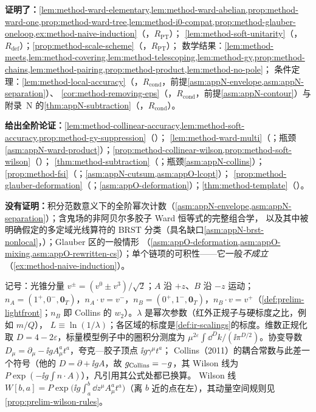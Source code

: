 \begin{tcolorbox}[enhanced,breakable,title=本章证明了什么／没有证明什么,fonttitle=\bfseries,
  colback=gray!3!white,colframe=gray!55!black,boxrule=0.6pt,arc=2pt,
  left=5pt,right=5pt,top=3pt,bottom=3pt,before skip=6pt,after skip=6pt]
\textbf{证明了：}\cref{lem:method-ward-elementary,lem:method-ward-abelian,prop:method-ward-one,prop:method-ward-tree,lem:method-i0-compat,prop:method-glauber-oneloop,ex:method-naive-induction}（\tagR，$R_{\mathrm{PT}}$）；
\cref{lem:method-soft-unitarity}（\tagR，$R_{\mathrm{def}}$）；\cref{prop:method-scale-scheme}（\tagR，$R_{\mathrm{PT}}$）；
数学结果：\cref{lem:method-meets,lem:method-covering,lem:method-telescoping,lem:method-gy,prop:method-chains,lem:method-pairing,prop:method-product,lem:method-no-pole}；
条件定理：\cref{lem:method-local-accuracy}（\tagR，$R_{\mathrm{cond}}$，前提\cref{asm:appN-envelope,asm:appN-separation}）、
\cref{cor:method-removing-eps}（\tagR，$R_{\mathrm{cond}}$，前提\cref{asm:appN-contour}）与附录~N 的\cref{thm:appN-subtraction}（\tagR，$R_{\mathrm{cond}}$）。\par
\textbf{给出全阶论证：}\cref{lem:method-collinear-accuracy,lem:method-soft-accuracy,prop:method-gy-suppression}（\tagA）；
\cref{lem:method-ward-multi}（\tagA；瓶颈\cref{asm:appN-ward-product}）；\cref{prop:method-collinear-wilson,prop:method-soft-wilson}（\tagA）；
\cref{thm:method-subtraction}（\tagA；瓶颈\cref{asm:appN-collins}）；\cref{prop:method-fsi}（\tagA；\cref{asm:appN-cutsum,asm:appO-lcopt}）；
\cref{prop:method-glauber-deformation}（\tagA；\cref{asm:appO-deformation}）；\cref{thm:method-template}（\tagA）。\par
\textbf{没有证明：}积分范数意义下的全阶幂次计数（\cref{asm:appN-envelope,asm:appN-separation}）；含鬼场的非阿贝尔多胶子 Ward 恒等式的完整组合学，
以及其中被明确假定的多定域光线算符的 BRST 分类（具名缺口\cref{asm:appN-brst-nonlocal}，\tagC）；Glauber 区的一般情形
（\cref{asm:appO-deformation,asm:appO-mixing,asm:appO-rewritten-cs}）；单个链项的可积性——它一般\emph{不成立}（\cref{ex:method-naive-induction}）。
\end{tcolorbox}

记号：光锥分量 $v^\pm=(v^0\pm v^3)/\sqrt2$；$A$ 沿 $+z$、$B$ 沿 $-z$ 运动；$n_A=(1^+,0^-,\mathbf 0_T)$，$n_A\cdot v=v^-$，$n_B=(0^+,1^-,\mathbf 0_T)$，$n_B\cdot v=v^+$（\cref{def:prelim-lightfront}；$n_B$ 即 Collins 的 $w_2$）。$\lambda$ 是幂次参数（红外正规子与硬标度之比，例如 $m/Q$），
$L\equiv\ln(1/\lambda)$；各区域的标度是\cref{def:ir-scalings}的标度。维数正规化取 $D=4-2\varepsilon$，标量模型例子中的圈积分测度为
$\mu^{2\varepsilon}\int\dd^Dk/(\ii\pi^{D/2})$。协变导数 $D_\mu=\partial_\mu-\ii gA^a_\mu t^a$，夸克—胶子顶点 $\ii g\gamma^\mu t^a$；
Collins（2011）的耦合常数与此差一个符号（他的 $D=\partial+\ii gA$，故 $g_{\rm Collins}=-g$，其 Wilson 线为 $P\exp(-\ii g\int n\cdot A)$），凡引用其公式处都已换算。
Wilson 线 $W[b,a]=P\exp\bigl(\ii g\int_a^b\dd z^\mu A^a_\mu t^a\bigr)$（离 $b$ 近的点在左），其动量空间规则见\cref{prop:prelim-wilson-rules}。

